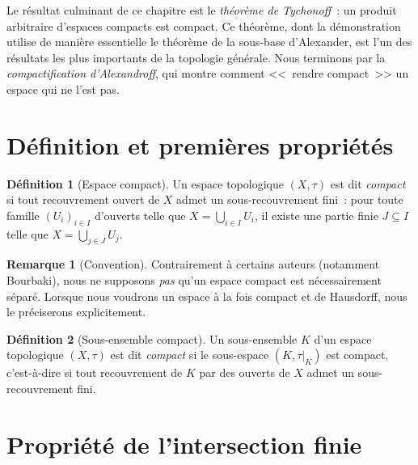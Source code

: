 \documentclass[12pt,a4paper,openany]{book}
\theoremstyle{definition}
\newtheorem{definition}{Définition}[chapter]
\theoremstyle{cours}
\theoremstyle{coursnormal}
\newtheorem{remarque}[theoreme]{Remarque}
\begin{document}
\medskip

Le résultat culminant de ce chapitre est le \emph{théorème de Tychonoff}~: un
produit arbitraire d'espaces compacts est compact. Ce théorème, dont la
démonstration utilise de manière essentielle le théorème de la sous-base
d'Alexander, est l'un des résultats les plus importants de la topologie
générale. Nous terminons par la \emph{compactification d'Alexandroff}, qui
montre comment <<~rendre compact~>> un espace qui ne l'est pas.

\section{Définition et premières propriétés}\label{sec:compact-def}

\begin{definition}[Espace compact]\label{def:compact}
  Un espace topologique $(X,\tau)$ est dit \emph{compact} si
  tout recouvrement ouvert de $X$ admet un sous-recouvrement fini~: pour toute
  famille $(U_i)_{i\in I}$ d'ouverts telle que $X=\bigcup_{i\in I}U_i$, il
  existe une partie finie $J\subseteq I$ telle que $X=\bigcup_{j\in J}U_j$.
\end{definition}

\begin{remarque}[Convention]\label{rem:rem:compact-hausdorff}
  Contrairement à certains auteurs (notamment Bourbaki), nous ne supposons
  \emph{pas} qu'un espace compact est nécessairement séparé. Lorsque nous
  voudrons un espace à la fois compact et de Hausdorff, nous le préciserons
  explicitement.
\end{remarque}

\begin{definition}[Sous-ensemble compact]\label{def:sous-ensemble-compact}
  Un sous-ensemble $K$ d'un espace topologique $(X,\tau)$ est dit
  \emph{compact} si le sous-espace $(K,\tau|_K)$
  est compact, c'est-à-dire si tout recouvrement de $K$ par des ouverts de $X$
  admet un sous-recouvrement fini.
\end{definition}

\section{Propriété de l'intersection finie}\label{sec:FIP}
\end{document}
